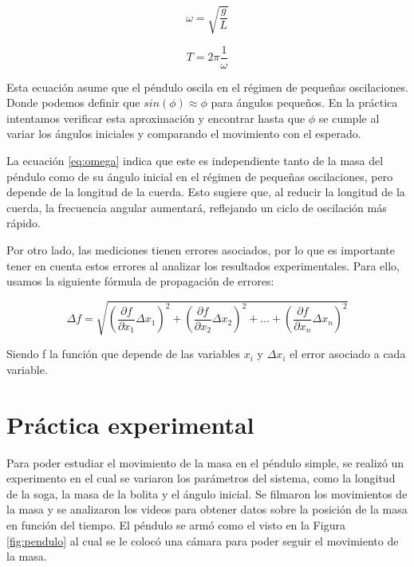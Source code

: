 \documentclass[12pt,a4]{article}
\begin{document}
\begin{equation}
    \omega = \sqrt{\frac{g}{L}}
    \label{eq:omega}
\end{equation}

\begin{equation}
    T = 2 \pi \frac{1}{\omega}
    \label{eq:periodo}
\end{equation}

Esta ecuación asume que el péndulo oscila en el régimen de pequeñas oscilaciones. 
Donde podemos definir que $sin(\phi) \approx \phi$ para ángulos pequeños. 
En la práctica intentamos verificar esta aproximación y encontrar hasta que $\phi$ se cumple al variar los ángulos iniciales y comparando el movimiento con el esperado.

La ecuación \ref{eq:omega} indica que este es independiente tanto de la masa del péndulo como de su ángulo inicial en el régimen de pequeñas oscilaciones, pero depende de la longitud de la cuerda. 
Esto sugiere que, al reducir la longitud de la cuerda, la frecuencia angular aumentará, reflejando un ciclo de oscilación más rápido.

Por otro lado, las mediciones tienen errores asociados, por lo que es importante tener en cuenta estos errores al analizar los resultados experimentales. Para ello, usamos la siguiente fórmula de propagación de errores:

\begin{equation} \label{eq:propagacion}
    \Delta f = \sqrt{\left( \frac{\partial f}{\partial x_1} \Delta x_1 \right)^2 + \left( \frac{\partial f}{\partial x_2} \Delta x_2 \right)^2 + \dots + \left( \frac{\partial f}{\partial x_n} \Delta x_n \right)^2}
\end{equation}

Siendo f la función que depende de las variables $x_i$ y $\Delta x_i$ el error asociado a cada variable.

\section{Práctica experimental}

Para poder estudiar el movimiento de la masa en el péndulo simple, se realizó un experimento en el cual se variaron los parámetros del sistema, como la longitud de la soga, la masa de la bolita y el ángulo inicial.
Se filmaron los movimientos de la masa y se analizaron los videos para obtener datos sobre la posición de la masa en función del tiempo.
El péndulo se armó como el visto en la Figura \ref{fig:pendulo} al cual se le colocó una cámara para poder seguir el movimiento de la masa.
\end{document}
